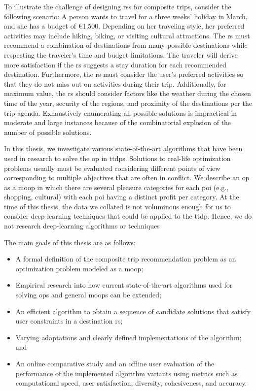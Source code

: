 To illustrate the challenge of designing \glspl{rs} for composite trips, consider the following scenario: A person wants to travel for a three weeks’ holiday in March, and she has a budget of €1,500. Depending on her traveling style, her preferred activities may include hiking, biking, or visiting cultural attractions. The \gls{rs} must recommend a combination of destinations from many possible destinations while respecting the traveler’s time and budget limitations. The traveler will derive more satisfaction if the \gls{rs} suggests a stay duration for each recommended destination. Furthermore, the \gls{rs} must consider the user’s preferred activities so that they do not miss out on activities during their trip. Additionally, for maximum value, the \gls{rs} should consider factors like the weather during the chosen time of the year, security of the regions, and proximity of the destinations per the trip agenda. Exhaustively enumerating all possible solutions is impractical in moderate and large instances because of the combinatorial explosion of the number of possible solutions.

In this thesis, we investigate various state-of-the-art algorithms that have been used in research to solve the \gls{op} in \glspl{ttdp}. Solutions to real-life optimization problems usually must be evaluated considering different points of view corresponding to multiple objectives that are often in conflict. We describe an \gls{op} as a \gls{moop} in which there are several pleasure categories for each \gls{poi} (e.g., shopping, cultural) with each \gls{poi} having a distinct profit per category. At the time of this thesis, the data we collated is not voluminous enough for us to consider deep-learning techniques that could be applied to the \gls{ttdp}. Hence, we do not research deep-learning algorithms or techniques

The main goals of this thesis are as follows:

\begin{itemize}
    \item A formal definition of the composite trip recommendation problem as an optimization problem modeled as a \gls{moop};
    \item Empirical research into how current state-of-the-art algorithms used for solving \glspl{op} and general \glspl{moop} can be extended;
    \item An efficient algorithm to obtain a sequence of candidate solutions that satisfy user constraints in a destination \gls{rs};
    \item Varying adaptations and clearly defined implementations of the algorithm; and
    \item An online comparative study and an offline user evaluation of the performance of the implemented algorithm variants using metrics such as computational speed, user satisfaction, diversity, cohesiveness, and accuracy.
\end{itemize}


